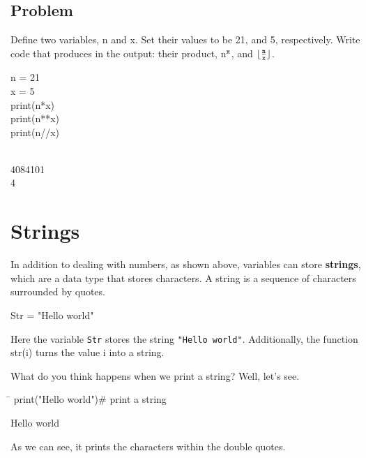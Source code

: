 \documentclass{article}
\newcommand{\define}[1]{\begin{center}\ttfamily #1\end{center}}
\newcommand{\icode}[1]{{\ttfamily #1}}
\newenvironment{code}{\begin{tcolorbox}\ttfamily}{\end{tcolorbox}}
\begin{document}
\subsection{Problem}
\noindent Define two variables, \icode{n} and \icode{x}. Set their values to be 21, and 5, respectively. Write code that produces in the output: their product, \icode{n}$^\text{\icode{x}}$, and $\lfloor \frac{\text{\icode{n}}}{\text{\icode{x}}} \rfloor$.
\vspace{1 mm}
\begin{code}
n = 21\\
x = 5\\
print(n*x)\\
print(n**x)\\
print(n//x)
\end{code}
\begin{tcolorbox}[colback=output]
	\\
	4084101\\
	4
\end{tcolorbox}

\section{Strings}
In addition to dealing with numbers, as shown above, variables can store \textbf{strings}, which are a data type that stores characters. A string is a sequence of characters surrounded by quotes.
\define{Str = "Hello world"}
Here the variable \texttt{Str} stores the string \texttt{"Hello world"}. Additionally, the function \icode{str(i)} turns the value \icode{i} into a string.

What do you think happens when we print a string? Well, let's see.

\begin{tcolorbox}
	\ttfamily
	\begin{tabbing}
		\hspace{3.25 in}\=\hspace{3.25 in} \kill
		print("Hello world")\>\# print a string
	\end{tabbing}
\end{tcolorbox}
\begin{tcolorbox}[colback=output]
	\ttfamily
	Hello world
\end{tcolorbox}
As we can see, it prints the characters within the double quotes.
\end{document}
